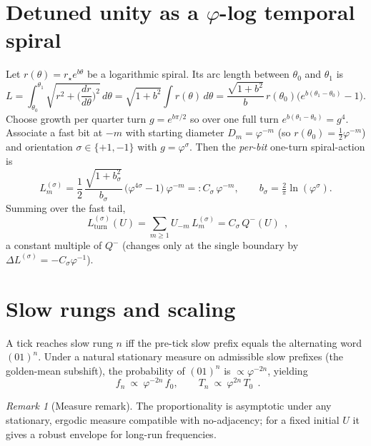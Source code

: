 \documentclass[11pt]{article}
\theoremstyle{remark}
\newtheorem{remark}{Remark}
\newcommand{\bb}[1]{\boxed{\;#1\;}}
\begin{document}
\section{Detuned unity as a \texorpdfstring{$\varphi$}{phi}-log temporal spiral}\label{sec:spiral}
Let $r(\theta)=r_\star e^{b\theta}$ be a logarithmic spiral.
Its arc length between $\theta_0$ and $\theta_1$ is
\begin{equation}\label{spiral-length}
L=\int_{\theta_0}^{\theta_1}\!\!\sqrt{r^2+\Big(\frac{dr}{d\theta}\Big)^2}\,d\theta
=\sqrt{1+b^2}\int r(\theta)\,d\theta
=\frac{\sqrt{1+b^2}}{b}\,r(\theta_0)\big(e^{b(\theta_1-\theta_0)}-1\big).
\end{equation}
Choose growth per quarter turn $g=e^{b\pi/2}$ so over one full turn $e^{b(\theta_1-\theta_0)}=g^4$.
Associate a fast bit at $-m$ with starting diameter $D_m=\varphi^{-m}$ (so $r(\theta_0)=\tfrac12\varphi^{-m}$) and orientation $\sigma\in\{+1,-1\}$ with $g=\varphi^\sigma$.
Then the \emph{per-bit} one-turn spiral-action is
\begin{equation}\label{bit-action}
L_m^{(\sigma)}=\frac12\,\frac{\sqrt{1+b_\sigma^2}}{b_\sigma}\,\big(\varphi^{4\sigma}-1\big)\ \varphi^{-m}
=:C_\sigma\,\varphi^{-m},\qquad b_\sigma=\tfrac{2}{\pi}\ln(\varphi^\sigma).
\end{equation}
Summing over the fast tail,
\begin{equation}\label{total-action}
\bb{\,L_{\text{turn}}^{(\sigma)}(U)=\sum_{m\ge1}U_{-m}\,L_m^{(\sigma)}=C_\sigma\,Q^-(U)\,},
\end{equation}
a constant multiple of $Q^-$ (changes only at the single boundary by $\Delta L^{(\sigma)}=-C_\sigma\varphi^{-1}$).

\section{Slow rungs and scaling}\label{sec:rungs}
A tick reaches slow rung $n$ iff the pre-tick slow prefix equals the alternating word $(01)^n$.
Under a natural stationary measure on admissible slow prefixes (the golden-mean subshift), the probability of $(01)^n$ is $\propto\varphi^{-2n}$, yielding
\begin{equation}\label{rung-scaling}
\bb{\,f_n\ \propto\ \varphi^{-2n}\,f_0,\qquad T_n\ \propto\ \varphi^{2n}\,T_0\,}.
\end{equation}
\begin{remark}[Measure remark]
The proportionality is asymptotic under any stationary, ergodic measure compatible with no-adjacency; for a fixed initial $U$ it gives a robust envelope for long-run frequencies.
\end{remark}
\end{document}
